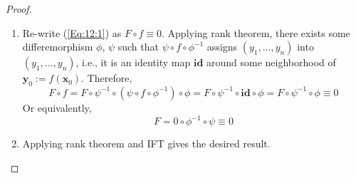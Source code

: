 \begin{proof}
\begin{enumerate}
\item
Re-write (\ref{Eq:12:1}) as $F\circ f\equiv0$. Applying rank theorem, there exists some differemorphism $\phi$, $\psi$ such that $\psi\circ f\circ\phi^{-1}$ assigns $(y_1,\dots,y_n)$ into $(y_1,\dots,y_n)$, i.e., it is an identity map $\bm{id}$ around some neighborhood of $\bm y_0:=f(\bm x_0)$. Therefore,
\[
F\circ f=F\circ\psi^{-1}\circ(\psi\circ f\circ\phi^{-1})\circ\phi
=
F\circ\psi^{-1}\circ\bm{id}\circ\phi
=
F\circ\psi^{-1}\circ\phi\equiv0
\]
Or equivalently,
\[
F=0\circ\phi^{-1}\circ\psi\equiv0
\]
\item
Applying rank theorem and IFT gives the desired result.
\end{enumerate}
\end{proof}



















